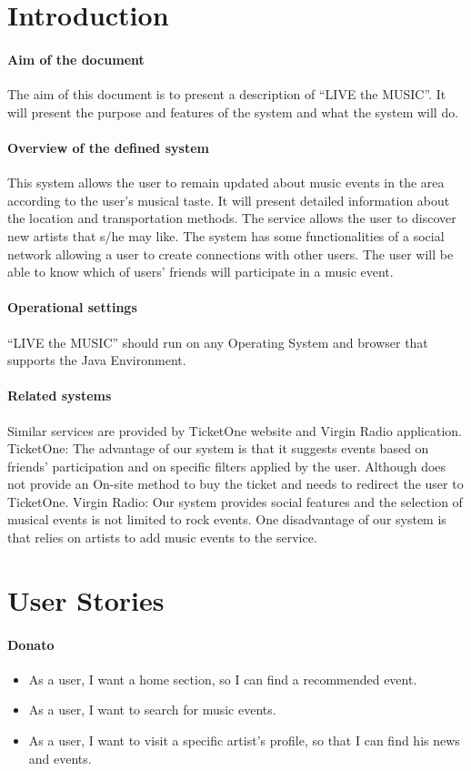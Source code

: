 \documentclass[11pt,a4paper]{article}
\begin{document}
\section{Introduction}
\paragraph{Aim of the document}
The aim of this document is to present a description of “LIVE the MUSIC”. It will present the purpose and features of the system and what the system will do.
\paragraph{Overview of the defined system}
This system allows the user to remain updated about music events in the area according to the user’s musical taste. It will present detailed information about the location and transportation methods. The service allows the user to discover new artists that s/he may like. The system has some functionalities of a social network allowing a user to create connections with other users. The user will be able to know which of users’ friends will participate in a music event.
\paragraph{Operational settings}
“LIVE the MUSIC” should run on any Operating System and browser that supports the Java Environment. 
\paragraph{Related systems}
Similar services are provided by TicketOne website and Virgin Radio application.
TicketOne: 
The advantage of our system is that it suggests events based on friends’ participation and on specific filters applied by the user. Although does not provide an On-site method to buy the ticket and needs to redirect the user to TicketOne. 
Virgin Radio:
Our system provides social features and the selection of musical events is not limited to rock events. One disadvantage of our system is that relies on artists to add music events to the service.
\section{User Stories}
\paragraph{Donato}
\begin{itemize}
\item As a user, I want a home section, so I can find a recommended event. 
\item As a user, I want to search for music events.
\item As a user, I want to visit a specific artist’s profile, so that I can find his news and events.
\end{itemize}
\end{document}
